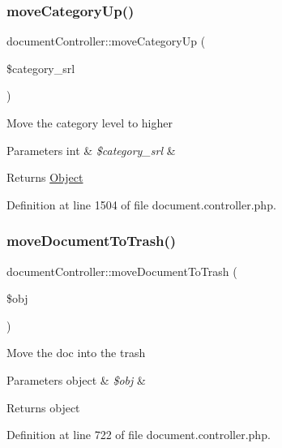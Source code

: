 \subsubsection{\texorpdfstring{move\+Category\+Up()}{moveCategoryUp()}}
{\footnotesize\ttfamily document\+Controller\+::move\+Category\+Up (\begin{DoxyParamCaption}\item[{}]{\$category\+\_\+srl }\end{DoxyParamCaption})}

Move the category level to higher 
\begin{DoxyParams}[1]{Parameters}
int & {\em \$category\+\_\+srl} & \\
\hline
\end{DoxyParams}
\begin{DoxyReturn}{Returns}
\hyperlink{classObject}{Object} 
\end{DoxyReturn}


Definition at line 1504 of file document.\+controller.\+php.

\hypertarget{classdocumentController_a3f861f8df6113ca3211c48be3c49f305}{}\label{classdocumentController_a3f861f8df6113ca3211c48be3c49f305} 
\subsubsection{\texorpdfstring{move\+Document\+To\+Trash()}{moveDocumentToTrash()}}
{\footnotesize\ttfamily document\+Controller\+::move\+Document\+To\+Trash (\begin{DoxyParamCaption}\item[{}]{\$obj }\end{DoxyParamCaption})}

Move the doc into the trash 
\begin{DoxyParams}[1]{Parameters}
object & {\em \$obj} & \\
\hline
\end{DoxyParams}
\begin{DoxyReturn}{Returns}
object 
\end{DoxyReturn}


Definition at line 722 of file document.\+controller.\+php.

\hypertarget{classdocumentController_a9072167f6533f269be32a0a43e147dae}{}\label{classdocumentController_a9072167f6533f269be32a0a43e147dae} 
